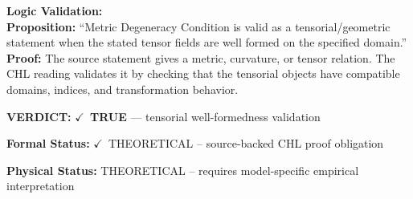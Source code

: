 \textbf{Logic Validation:}\\
\textbf{Proposition:} ``Metric Degeneracy Condition is valid as a tensorial/geometric statement when the stated
tensor fields are well formed on the specified domain.''\\
\textbf{Proof:} The source statement gives a metric, curvature, or tensor relation. The CHL reading
validates it by checking that the tensorial objects have compatible domains, indices,
and transformation behavior.

\textbf{VERDICT:} \ensuremath{\checkmark}\ \textbf{TRUE} --- tensorial well-formedness validation

\textbf{Formal Status:} \ensuremath{\checkmark}\ THEORETICAL -- source-backed CHL proof obligation

\textbf{Physical Status:} THEORETICAL -- requires model-specific empirical interpretation
\par\vspace{0.45em}
\par
\ifTZPDarkEdition
{}
\fi
\endgroup
\endgroup
